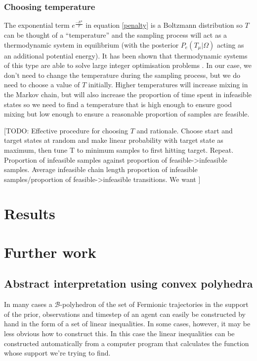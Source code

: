 \documentclass{article}
\begin{document}
\subsubsection{Choosing temperature}
The exponential term $e^{\frac{-E^\mu}{T}}$ in equation \eqref{penalty} is a Boltzmann distribution so $T$ can be thought of a ``temperature'' and the sampling process will act as a thermodynamic system in equilibrium (with the posterior $P_e(T_\mu|\Omega)$ acting as an additional potential energy).  It has been shown that thermodynamic systems of this type are able to solve large integer optimisation problems \cite{kirkpatrick1983optimization}. In our case, we don't need to change the temperature during the sampling process, but we do need to choose a value of $T$ initially. Higher temperatures will increase mixing in the Markov chain, but will also increase the proportion of time spent in infeasible states so we need to find a temperature that is high enough to ensure good mixing but low enough to ensure a reasonable proportion of samples are feasible.

[TODO: Effective procedure for choosing $T$ and rationale. Choose start and target states at random and make linear probability with target state as maximum, then tune T to minimum samples to first hitting target. Repeat.
 Proportion of infeasible samples against proportion of feasible->infeasible samples. Average infeasible chain length proportion of infeasible samples/proportion of feasible->infeasible transitions. We want ]

\section{Results}

\section{Further work}
\subsection{Abstract interpretation using convex polyhedra}

In many cases a $\mathcal{B}$-polyhedron of the set of Fermionic trajectories in the support of the prior, observations and timestep of an agent can easily be constructed by hand in the form of a set of linear inequalities. In some cases, however, it may be less obvious how to construct this. In this case the linear inequalities can be constructed automatically from a computer program that calculates the function whose support we're trying to find.
\end{document}
